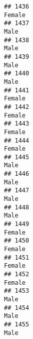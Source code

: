 \documentclass[]{article}
\begin{document}
\begin{verbatim}
## 1436                                                                                                                          Female
## 1437                                                                                                                            Male
## 1438                                                                                                                            Male
## 1439                                                                                                                            Male
## 1440                                                                                                                            Male
## 1441                                                                                                                          Female
## 1442                                                                                                                          Female
## 1443                                                                                                                          Female
## 1444                                                                                                                          Female
## 1445                                                                                                                            Male
## 1446                                                                                                                            Male
## 1447                                                                                                                            Male
## 1448                                                                                                                            Male
## 1449                                                                                                                          Female
## 1450                                                                                                                          Female
## 1451                                                                                                                          Female
## 1452                                                                                                                          Female
## 1453                                                                                                                            Male
## 1454                                                                                                                            Male
## 1455                                                                                                                            Male

\end{verbatim}
\end{document}
